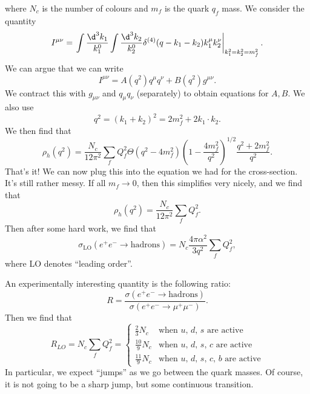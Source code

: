 \documentclass[a4paper]{article}
\begin{document}
where $N_c$ is the number of colours and $m_f$ is the quark $q_f$ mass. We consider the quantity 
\[
  I^{\mu\nu} = \left.\int \frac{\d^3 k_1}{k_1^0} \int \frac{\d^3 k_2}{k_2^0} \delta^{(4)}(q - k_1 - k_2) k_1^\mu k_2^\nu\right|_{k_1^2 = k_2^2 = m_f^2}.
\]
We can argue that we can write
\[
  I^{\mu\nu} = A(q^2) q^\mu q^\nu + B(q^2) g^{\mu\nu}.
\]
We contract this with $g_{\mu\nu}$ and $q_\mu q_\nu$ (separately) to obtain equations for $A, B$. We also use
\[
  q^2 = (k_1 + k_2)^2 = 2 m_f^2 + 2 k_1 \cdot k_2.
\]
We then find that
\[
  \rho_h(q^2) = \frac{N_c}{12 \pi^2} \sum_f Q_f^2 \Theta(q^2 - 4 m_f^2)\left(1 - \frac{4 m_f^2}{q^2}\right)^{1/2} \frac{q^2 + 2 m_f^2}{q^2}.
\]
That's it! We can now plug this into the equation we had for the cross-section. It's still rather messy. If all $m_f \to 0$, then this simplifies very nicely, and we find that
\[
  \rho_h(q^2) = \frac{N_c}{12 \pi^2} \sum_f Q_f^2.
\]
Then after some hard work, we find that
\[
  \sigma_{\mathrm{LO}}(e^+ e^- \to \mathrm{hadrons}) = N_c \frac{4\pi \alpha^2}{3q^2} \sum_f Q_f^2,
\]
where LO denotes ``leading order''.

An experimentally interesting quantity is the following ratio:
\[
  R = \frac{\sigma(e^+ e^- \to \mathrm{hadrons})}{\sigma(e^+ e^- \to \mu^+ \mu^-)}.
\]
Then we find that
\[
  R_{LO} = N_c \sum_f Q_f^2 =
  \begin{cases}
    \frac{2}{3} N_c & \text{when $u$, $d$, $s$ are active}\\
    \frac{10}{9} N_c & \text{when $u$, $d$, $s$, $c$ are active}\\
    \frac{11}{9} N_c & \text{when $u$, $d$, $s$, $c$, $b$ are active}
  \end{cases}
\]
In particular, we expect ``jumps'' as we go between the quark masses. Of course, it is not going to be a sharp jump, but some continuous transition.
\end{document}
